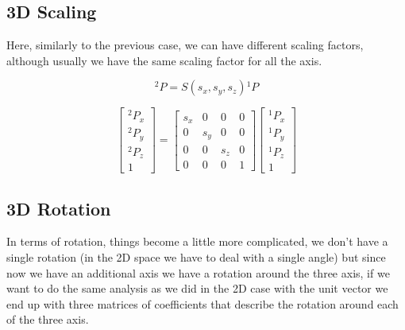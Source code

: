 \subsection{3D Scaling}

Here, similarly to the previous case, we can have different scaling factors, although usually we have the same scaling factor for all the axis.

\[
  {}^2P = S(s_x, s_y, s_z) {}^1P 
\]

\[
    \begin{bmatrix}
        {}^2P_x \\
        {}^2P_y \\
        {}^2P_z \\
        1
    \end{bmatrix}
    =
    \begin{bmatrix}
        s_x & 0 & 0 & 0 \\
        0 & s_y & 0 & 0 \\
        0 & 0 & s_z & 0 \\
        0 & 0 & 0 & 1
    \end{bmatrix}
    \begin{bmatrix}
        {}^1P_x \\
        {}^1P_y \\
        {}^1P_z \\
        1
    \end{bmatrix}   
\]

\subsection{3D Rotation}

In terms of rotation, things become a little more complicated, we don't have a single rotation (in the 2D space we have to deal with a single angle) but since now we have an additional axis we have a rotation around the three axis, if we want to do the same analysis as we did in the 2D case with the unit vector we end up with three matrices of coefficients that describe the rotation around each of the three axis.

